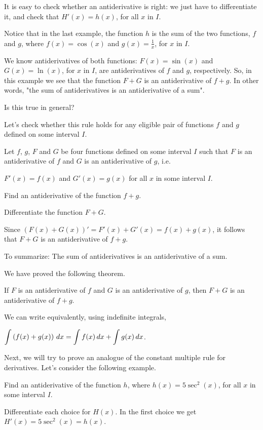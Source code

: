 \documentclass{ximera}
\begin{document}
It is easy to check whether an antiderivative is right: we just have to differentiate it, and check that $H'(x)=h(x)$, for all $x$ in $I$.

Notice that in the last example, the function $h$ is the sum of the two functions, $f$ and $g$, where 
$f(x)=\cos(x)$ and $g(x)=\frac{1}{x}$, for $x$ in $I$.

We know antiderivatives of both functions:  $F(x)=\sin(x)$ and $G(x)=\ln(x)$,  for $x$ in $I$, are antiderivatives of $f$ and $g$, respectively.
So, in this example we see that the function  $F+G$ is an antiderivative of $f+g$.
In other words, "the sum of antiderivatives is an antiderivative of a sum".

Is this true in general? 

Let's check whether this rule holds for any eligible pair of functions $f$ and $g$ defined on some interval $I$.
 \begin{question}
	Let $f$, $g$, $F$ and $G$ be four functions defined on some interval $I$ such that $F$ is an antiderivative of $f$ 
	and $G$ is an antiderivative of $g$, i.e.

	$F'(x)=f(x)$ and $G'(x)=g(x)$ for all $x$ in some interval $I$.

	  Find an antiderivative of the function $f+g$.
	    \begin{hint}
	    Differentiate the function $F+G$.
	     \end{hint}
	     Since
	     $\left(F(x)+G(x)\right)'=F'(x)+G'(x)=f(x)+g(x)$,
	     it follows that  $F+G$ is an antiderivative of $f+g$. 
	     
	 To summarize: The sum of antiderivatives is an antiderivative of a sum. 
\end{question}
We have proved the following theorem.

\begin{theorem}\label{theorem:SRA}
	If $F$ is an antiderivative of $f$ and $G$ is an antiderivative of
	$g$, then $F+G$ is an antiderivative of $f+g$.
	
	We can write equivalently, using indefinite integrals, 
	
	$\displaystyle  \int \left(f(x)+g(x)\right) \,d x= \int f(x)\,d x +\int g(x) \,d x$.
\end{theorem}

Next, we will try to prove an analogue of the constant multiple rule for derivatives.
Let's consider the following example.
\begin{example}
	  Find  an antiderivative of the function $h$, where
	   $h(x)=5\sec^{2}(x)$,  for all $x$ in some interval $I$.
	  \begin{multipleChoice}
	  \end{multipleChoice}
	  \begin{feedback}
	    Differentiate each choice for $H(x)$.  In the first choice we get
	    $H'(x)=5\sec^{2}(x)=h(x)$.
	  \end{feedback}
\end{example}
\end{document}
